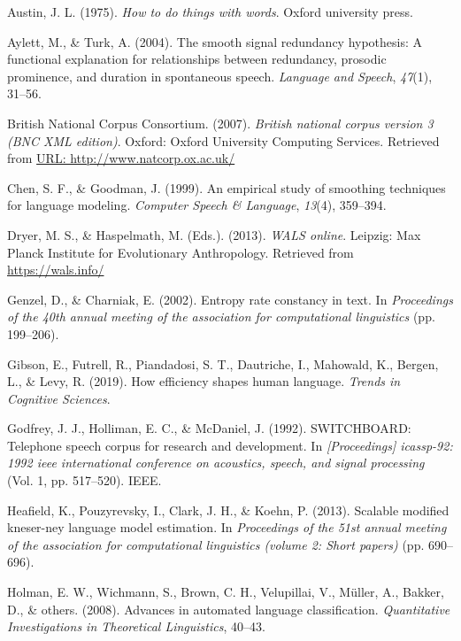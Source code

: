 \documentclass[10pt, letterpaper]{article}
\begin{document}
\leavevmode\hypertarget{ref-austin1975}{}%
Austin, J. L. (1975). \emph{How to do things with words}. Oxford
university press.

\leavevmode\hypertarget{ref-aylett2004}{}%
Aylett, M., \& Turk, A. (2004). The smooth signal redundancy hypothesis:
A functional explanation for relationships between redundancy, prosodic
prominence, and duration in spontaneous speech. \emph{Language and
Speech}, \emph{47}(1), 31--56.

\leavevmode\hypertarget{ref-british-national-corpus-consortium2007}{}%
British National Corpus Consortium. (2007). \emph{British national
corpus version 3 (BNC XML edition)}. Oxford: Oxford University Computing
Services. Retrieved from
\href{URL:\%20http://www.natcorp.ox.ac.uk/}{URL: http://www.natcorp.ox.ac.uk/}

\leavevmode\hypertarget{ref-chen1999}{}%
Chen, S. F., \& Goodman, J. (1999). An empirical study of smoothing
techniques for language modeling. \emph{Computer Speech \& Language},
\emph{13}(4), 359--394.

\leavevmode\hypertarget{ref-2013}{}%
Dryer, M. S., \& Haspelmath, M. (Eds.). (2013). \emph{WALS online}.
Leipzig: Max Planck Institute for Evolutionary Anthropology. Retrieved
from \url{https://wals.info/}

\leavevmode\hypertarget{ref-genzel2002}{}%
Genzel, D., \& Charniak, E. (2002). Entropy rate constancy in text. In
\emph{Proceedings of the 40th annual meeting of the association for
computational linguistics} (pp. 199--206).

\leavevmode\hypertarget{ref-gibson2019}{}%
Gibson, E., Futrell, R., Piandadosi, S. T., Dautriche, I., Mahowald, K.,
Bergen, L., \& Levy, R. (2019). How efficiency shapes human language.
\emph{Trends in Cognitive Sciences}.

\leavevmode\hypertarget{ref-godfrey1992}{}%
Godfrey, J. J., Holliman, E. C., \& McDaniel, J. (1992). SWITCHBOARD:
Telephone speech corpus for research and development. In
\emph{{[}Proceedings{]} icassp-92: 1992 ieee international conference on
acoustics, speech, and signal processing} (Vol. 1, pp. 517--520). IEEE.

\leavevmode\hypertarget{ref-heafield2013}{}%
Heafield, K., Pouzyrevsky, I., Clark, J. H., \& Koehn, P. (2013).
Scalable modified kneser-ney language model estimation. In
\emph{Proceedings of the 51st annual meeting of the association for
computational linguistics (volume 2: Short papers)} (pp. 690--696).

\leavevmode\hypertarget{ref-holman2008}{}%
Holman, E. W., Wichmann, S., Brown, C. H., Velupillai, V., Müller, A.,
Bakker, D., \& others. (2008). Advances in automated language
classification. \emph{Quantitative Investigations in Theoretical
Linguistics}, 40--43.
\end{document}
